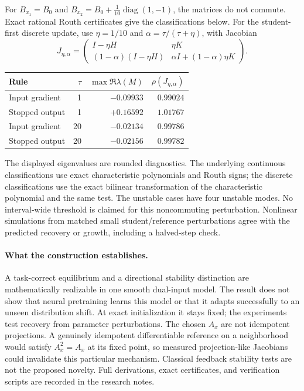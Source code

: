 \documentclass[11pt,a4paper]{article}
\begin{document}
For $B_{x_1}=B_0$ and $B_{x_2}=B_0+\tfrac1{10}\operatorname{diag}(1,-1)$,
the matrices do not commute. Exact rational Routh certificates give the
classifications below. For the student-first discrete update, use
$\eta=1/10$ and $\alpha=\tau/(\tau+\eta)$, with Jacobian
\begin{equation}
 J_{\eta,\alpha}=\begin{pmatrix}
 I-\eta H&\eta K\\
 (1-\alpha)(I-\eta H)&\alpha I+(1-\alpha)\eta K
 \end{pmatrix}.
 \label{eq:discreteblock}
\end{equation}
\begin{center}
\begin{tabular}{lrrr}
Rule & $\tau$ & $\max\Re\lambda(M)$ & $\rho(J_{\eta,\alpha})$\\ \hline
Input gradient & 1 & $-0.09933$ & $0.99024$\\
Stopped output & 1 & $+0.16592$ & $1.01767$\\
Input gradient & 20 & $-0.02134$ & $0.99786$\\
Stopped output & 20 & $-0.02156$ & $0.99782$
\end{tabular}
\end{center}
The displayed eigenvalues are rounded diagnostics. The underlying
continuous classifications use exact characteristic polynomials and
Routh signs; the discrete classifications use the exact bilinear
transformation of the characteristic polynomial and the same test.
The unstable cases have four unstable modes. No interval-wide threshold
is claimed for this noncommuting perturbation. Nonlinear simulations
from matched small student/reference perturbations agree with the
predicted recovery or growth, including a halved-step check.

\paragraph{What the construction establishes.}
A task-correct equilibrium and a directional stability distinction are
mathematically realizable in one smooth dual-input model. The result
does not show that neural pretraining learns this model or that it adapts
successfully to an unseen distribution shift. At exact initialization
it stays fixed; the experiments test recovery from parameter perturbations.
The chosen $A_x$ are not idempotent projections. A genuinely idempotent
differentiable reference on a neighborhood would satisfy $A_x^2=A_x$
at its fixed point, so measured projection-like Jacobians could invalidate
this particular mechanism. Classical feedback stability tests are not
the proposed novelty. Full derivations, exact certificates, and verification
scripts are recorded in the research notes.
\end{document}
